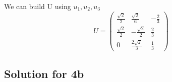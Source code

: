 \documentclass[a4paper,fleqn,12pt]{article}
\begin{document}
We can build U using $u_1, u_2, u_3$
$$
U = \begin{pmatrix} 
\frac{\sqrt{2}}{2} & \frac{\sqrt{2}}{6} &  -\frac{2}{3}\\
\frac{\sqrt{2}}{2}& -\frac{\sqrt{2}}{2} &  \frac{2}{3}\\
0 & \frac{2\sqrt{2}}{3} & \frac{1}{3}
\end{pmatrix}
$$

\newpage
\subsection{Solution for 4b}
\end{document}
